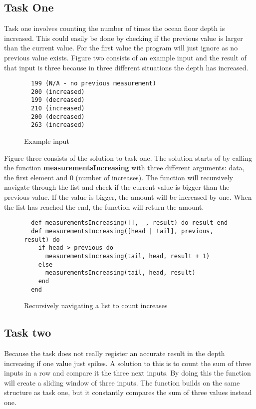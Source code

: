 \documentclass[a4paper,11pt]{article}
\begin{document}
\subsection*{Task One}
Task one involves counting the number of times the ocean floor depth is increased. This could easily be done by checking if the previous value is larger than the current value. For the first value the program will just ignore as no previous value exists. Figure two consists of an example input and the result of that input is three because in three different situations the depth has increased.

\begin{figure}[H]
\begin{verbatim}
  199 (N/A - no previous measurement)
  200 (increased)
  199 (decreased)
  210 (increased)
  200 (decreased)
  263 (increased)
\end{verbatim}
\caption{Example input}
\label{Figure:2}
\end{figure}

Figure three consists of the solution to task one. The solution starts of by calling the function \textbf{measurementsIncreasing} with three different arguments: data, the first element and 0 (number of increases). The function will recursively navigate through the list and check if the current value is bigger than the previous value. If the value is bigger, the amount will be increased by one. When the list has reached the end, the function will return the amount.

\begin{figure}[H]
\begin{verbatim}
  def measurementsIncreasing([], _, result) do result end
  def measurementsIncreasing([head | tail], previous, result) do
    if head > previous do
      measurementsIncreasing(tail, head, result + 1)
    else
      measurementsIncreasing(tail, head, result)
    end
  end
\end{verbatim}
\caption{Recursively navigating a list to count increases}
\label{Figure:3}
\end{figure}

\subsection*{Task two}
Because the task does not really register an accurate result in the depth increasing if one value just spikes. A solution to this is to count the sum of three inputs in a row and compare it the three next inputs. By doing this the function will create a sliding window of three inputs. The function builds on the same structure as task one, but it constantly compares the sum of three values instead one.
\end{document}
